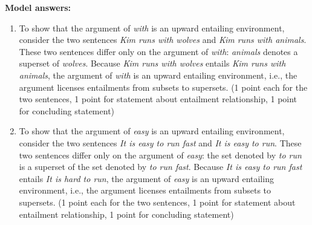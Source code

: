 \documentclass[a4,11pt]{article}
\begin{document}
\begin{enumerate}[leftmargin = 12pt]
\begin{enumerate}[noitemsep]
\end{enumerate}

{\bf Model answers:} 

\begin{enumerate}[noitemsep]

\item To show that the argument of \textit{with} is an upward entailing environment, consider the two sentences \textit{Kim runs with wolves} and \textit{Kim runs with animals}. These two sentences differ only on the argument of {\em with}: {\em animals} denotes a superset of {\em wolves}. Because \textit{Kim runs with wolves} entails \textit{Kim runs with animals}, the argument of \textit{with} is an upward entailing environment, i.e., the argument licenses entailments from subsets to supersets. (1 point each for the two sentences, 1 point for statement about entailment relationship, 1 point for concluding statement)

\item To show that the argument of \textit{easy} is an upward entailing environment, consider the two sentences {\em It is easy to run fast} and {\em It is easy to run}. These two sentences differ only on the argument of {\em easy}: the set denoted by {\em to run} is a superset of the set denoted by {\em to run fast}. Because {\em It is easy to run fast} entails {\em It is hard to run}, the argument of {\em easy} is an upward entailing environment, i.e., the argument licenses entailments from subsets to supersets. (1 point each for the two sentences, 1 point for statement about entailment relationship, 1 point for concluding statement)

\end{enumerate}


\end{enumerate}
\end{document}
